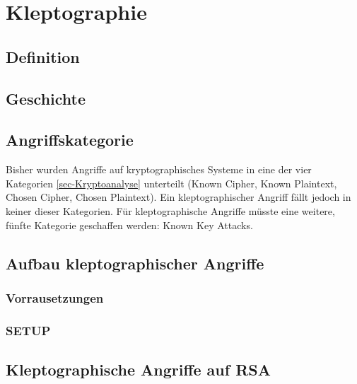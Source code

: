 \chapter{Kleptographie}
    \section{Definition}


    \section{Geschichte}

    \section{Angriffskategorie}
        Bisher wurden Angriffe auf kryptographisches Systeme in eine der vier Kategorien \ref{sec-Kryptoanalyse} unterteilt (Known Cipher, Known Plaintext, Chosen Cipher, Chosen Plaintext). Ein kleptographischer Angriff fällt jedoch in keiner dieser Kategorien. Für kleptographische Angriffe müsste eine weitere, fünfte Kategorie geschaffen werden: Known Key Attacks. 

    \section{Aufbau kleptographischer Angriffe}


        \subsection{Vorrausetzungen}


        \subsection{SETUP}

    \section{Kleptographische Angriffe auf RSA}

